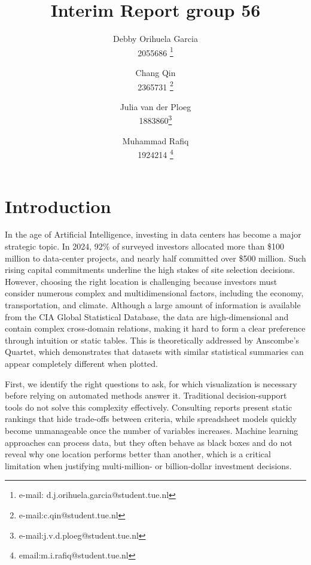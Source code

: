 \documentclass{vgtc}                          %
\title{Interim Report group 56}
\author{Debby Orihuela Garcia\\
        2055686
\thanks{e-mail: d.j.orihuela.garcia@student.tue.nl} %
\and Chang Qin\\ 
2365731 \thanks{e-mail:c.qin@student.tue.nl} %
\and Julia van der Ploeg\\ 
     1883860\thanks{e-mail:j.v.d.ploeg@student.tue.nl}
\and Muhammad Rafiq\\ 
     1924214
     \thanks{
     email:m.i.rafiq@student.tue.nl
     }}
\begin{document}

\maketitle

\section{Introduction}
In the age of Artificial Intelligence, investing in data centers has become a major strategic topic. In 2024, 92\% of surveyed investors allocated more than \$100 million to data-center projects, and nearly half committed over \$500 million\cite{CBRE2024InvestorSurvey}. Such rising capital commitments underline the high stakes of site selection decisions. However, choosing the right location is challenging because investors must consider numerous complex and multidimensional factors, including the economy, transportation, and climate. Although a large amount of information is available from the CIA Global Statistical Database, the data are high-dimensional and contain complex cross-domain relations, making it hard to form a clear preference through intuition or static tables. This is theoretically addressed by Anscombe’s Quartet, which demonstrates that datasets with similar statistical summaries can appear completely different when plotted\cite{Anscombe1973}. 

First, we identify the right questions to ask, for which visualization is necessary before relying on automated methods answer it.
Traditional decision-support tools do not solve this complexity effectively. Consulting reports present static rankings that hide trade-offs between criteria, while spreadsheet models quickly become unmanageable once the number of variables increases. Machine learning approaches can process data, but they often behave as black boxes and do not reveal why one location performs better than another, which is a critical limitation when justifying multi-million- or billion-dollar investment decisions\cite{Rudin2019}. 
\end{document}
